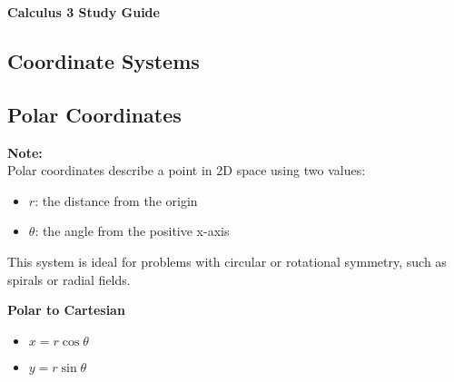 \documentclass[10pt]{article}                               %
\begin{document}
\begin{center}
    {\Huge \textbf{Calculus 3 Study Guide}} \\
    \vspace{0.5em}
\end{center}

\vspace{1em}


\begin{defaultbox}

    \section*{Coordinate Systems}


    \begin{adjustwidth}{2em}{0pt}

        \subsection*{Polar Coordinates}

        \begin{adjustwidth}{2em}{0pt}

            \begin{notebox}

                \textbf{Note:} \\
                Polar coordinates describe a point in 2D space using two values:

                \begin{itemize}
                    \item \( r \): the distance from the origin
                    \item \( \theta \): the angle from the positive x-axis
                \end{itemize}

                This system is ideal for problems with circular or rotational symmetry, such as spirals or radial fields.

            \end{notebox}


            \vspace{0.5em}

            \textbf{Polar to Cartesian}

            \begin{itemize}
                \item \( x = r\cos\theta \)
                \item \( y = r\sin\theta \)
            \end{itemize}


\end{adjustwidth}
\end{adjustwidth}
\end{defaultbox}
\end{document}
